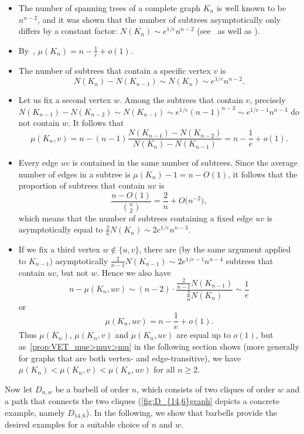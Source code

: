 \documentclass[11pt]{article}
\theoremstyle{definition}
\begin{document}
\begin{itemize}
\item The number of spanning trees of a complete graph $K_n$ is well known to be $n^{n-2}$, and it was shown that the number of subtrees asymptotically only differs by a constant factor: $N(K_n) \sim e^{1/e} n^{n-2}$ (see~\cite[Thm. 3.3]{CGMV18} as well as \cite{CGMV15}).
\item By~\cite[Cor.~2]{Wagner21_prob_spanning}, $\mu(K_n) = n - \frac1e + o(1)$.
\item The number of subtrees that contain a specific vertex $v$ is
$$N(K_n) - N(K_{n-1}) \sim N(K_n) \sim e^{1/e} n^{n-2}.$$
\item Let us fix a second vertex $w$. Among the subtrees that contain $v$, precisely $N(K_{n-1}) - N(K_{n-2}) \sim N(K_{n-1}) \sim e^{1/e} (n-1)^{n-3} \sim e^{1/e-1} n^{n-3}$ do not contain $w$. It follows that
$$\mu(K_n,v) = n - (n-1) \frac{N(K_{n-1}) - N(K_{n-2})}{N(K_n) - N(K_{n-1})} = n - \frac1e + o(1).$$
\item Every edge $uv$ is contained in the same number of subtrees. Since the average number of edges in a subtree is $\mu(K_n) - 1 = n - O(1)$, it follows that the proportion of subtrees that contain $uv$ is
$$\frac{n-O(1)}{\binom{n}{2}} = \frac{2}{n} + O\big(n^{-2}\big),$$
which means that the number of subtrees containing a fixed edge $uv$ is asymptotically equal to $\frac{2}{n} N(K_n) \sim 2e^{1/e} n^{n-3}$.
\item If we fix a third vertex $w \notin \{u,v\}$, there are (by the same argument applied to $K_{n-1}$) asymptotically $\frac{2}{n-1} N(K_{n-1}) \sim 2e^{1/e-1} n^{n-4}$ subtrees that contain $uv$, but not $w$. Hence we also have
$$n - \mu(K_n,uv) \sim (n-2) \cdot \frac{\frac{2}{n-1} N(K_{n-1})}{\frac{2}{n} N(K_n)} \sim \frac{1}{e}$$
or
$$\mu(K_n,uv) = n - \frac{1}{e} + o(1).$$
Thus $\mu(K_n)$, $\mu(K_n,v)$ and $\mu(K_n,uv)$ are equal up to $o(1)$, but as~\cref{prop:VET_mue>muv>mu} in the following section shows (more generally for graphs that are both vertex- and edge-transitive), we have $\mu(K_n) < \mu(K_n,v) < \mu(K_n,uv)$ for all $n \ge 2$.
\end{itemize}

Now let $D_{n,w}$ be a barbell of order $n$, which consists of two cliques of order $w$ and a path that connects the two cliques (\cref{fig:D_{14,6}graph} depicts a concrete example, namely $D_{14,6}$). In the following, we show that barbells provide the desired examples for a suitable choice of $n$ and $w$.
\end{document}
